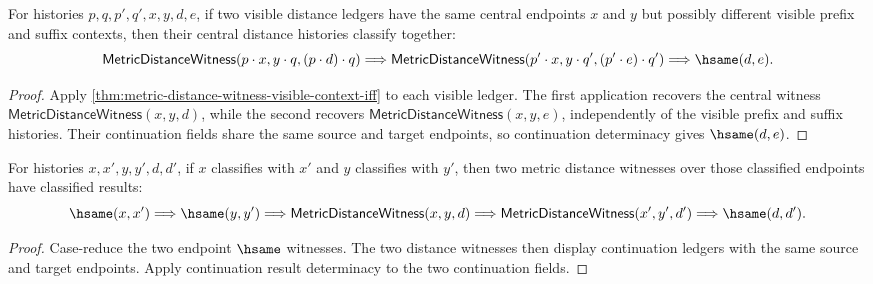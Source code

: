 \begin{theorem}
\label{thm:metric-distance-witness-visible-context-prefix-independent-result-deterministic}
For histories $p,q,p',q',x,y,d,e$, if two visible distance ledgers have the
same central endpoints $x$ and $y$ but possibly different visible prefix and
suffix contexts, then their central distance histories classify together:
$$
\mathsf{MetricDistanceWitness}(p\cdot x,y\cdot q,(p\cdot d)\cdot q)
\Longrightarrow
\mathsf{MetricDistanceWitness}(p'\cdot x,y\cdot q',(p'\cdot e)\cdot q')
\Longrightarrow
\hsame(d,e).
$$
\end{theorem}
\begin{proof}
Apply \autoref{thm:metric-distance-witness-visible-context-iff} to each visible
ledger. The first application recovers the central witness
$\mathsf{MetricDistanceWitness}(x,y,d)$, while the second recovers
$\mathsf{MetricDistanceWitness}(x,y,e)$, independently of the visible prefix
and suffix histories. Their continuation fields share the same source and
target endpoints, so continuation determinacy gives $\hsame(d,e)$.
\end{proof}

\begin{theorem}
\label{thm:metric-distance-witness-hsame-result-deterministic}
For histories $x,x',y,y',d,d'$, if $x$ classifies with $x'$ and $y$
classifies with $y'$, then two metric distance witnesses over those classified
endpoints have classified results:
$$
\hsame(x,x')\Longrightarrow
\hsame(y,y')\Longrightarrow
\mathsf{MetricDistanceWitness}(x,y,d)\Longrightarrow
\mathsf{MetricDistanceWitness}(x',y',d')\Longrightarrow
\hsame(d,d').
$$
\end{theorem}
\begin{proof}
Case-reduce the two endpoint $\hsame$ witnesses. The two distance witnesses then
display continuation ledgers with the same source and target endpoints. Apply
continuation result determinacy to the two continuation fields.
\end{proof}

